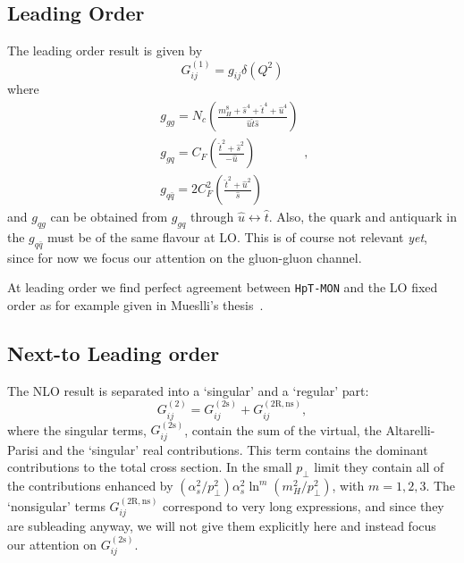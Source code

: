 \documentclass[10pt]{report}
\begin{document}
\subsection{Leading Order}
The leading order result is given by 
\begin{equation}
G_{i j}^{(1)}=g_{i j} \delta\left(Q^{2}\right)
\end{equation}
where
\begin{equation}
\begin{array}{l}
g_{g g}=N_{c}\left(\frac{m_{H}^{8}+\hat{s}^{4}+\hat{t}^{4}+\hat{u}^{4}}{\hat{u} \hat{t} \hat{s}}\right) \\
g_{g q}=C_{F}\left(\frac{\hat{t}^{2}+\hat{s}^{2}}{-\hat{u}}\right) \\
g_{q \bar{q}}=2 C_{F}^{2}\left(\frac{\hat{t}^{2}+\hat{u}^{2}}{\hat{s}}\right)
\end{array},
\end{equation}
and $g_{q g}$ can be obtained from $g_{g q}$ through $\hat{u} \leftrightarrow \hat{t}$. Also, the quark and antiquark in the $g_{q \bar{q}}$ must be of the same flavour at LO. This is of course not relevant \textit{yet}, since for now we focus our attention on the gluon-gluon channel.

At leading order we find perfect agreement between \texttt{HpT-MON} and the LO fixed order as for example given in Mueslli's thesis~\citep{Muselli2017a}.


\subsection{Next-to Leading order}

The NLO result is separated into a `singular' and a `regular' part:
\begin{equation}
G_{i j}^{(2)}=G_{i j}^{(\mathrm{2s})}+G_{i j}^{(2 \mathrm{R}, \mathrm{ns})},
\end{equation}
where the singular terms, $G_{i j}^{(\mathrm{2s})}$, contain the sum of the virtual, the Altarelli-Parisi and the `singular' real contributions. This term contains the dominant contributions to the total cross section. In the small $p_\perp$ limit they contain all of the contributions enhanced by $\left(\alpha_{s}^{2} / p_{\perp}^{2}\right) \alpha_{s}^{2} \ln ^{m}\left(m_{H}^{2} / p_{\perp}^{2}\right)$, with $m=1,2,3$. The `nonsigular' terms $G_{i j}^{(2 \mathrm{R}, \mathrm{ns})}$ correspond to very long expressions, and since they are subleading anyway, we will not give them explicitly here and instead focus our attention on $G_{i j}^{(\mathrm{2s})}$.
\end{document}

